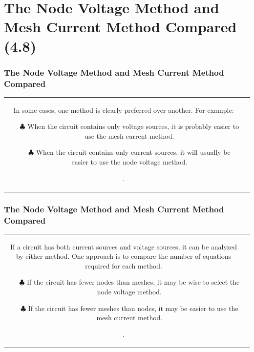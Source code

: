 \documentclass[aspectratio=169]{beamer}
\begin{document}
\section{The Node Voltage Method and Mesh Current Method Compared (4.8)}
\begin{frame}[fragile]
	\frametitle{ The Node Voltage Method and Mesh Current Method Compared}
	\begin{tabular}{cc}
			\begin{columns}
				\begin{column}{1\textwidth}  %
					In some cases, one method is clearly preferred over another. For example:	\newline
		
					\begin{itemize}
						\item[$\clubsuit$] {When the circuit contains
only voltage sources, it is probably easier to use the mesh current method.}
						\item[$\clubsuit$] {When the circuit contains only
current sources, it will usually be easier to use the node voltage method.}						
					\end{itemize}
				.
				\end{column}
			\end{columns}
		
	\end{tabular}
\end{frame}
\begin{frame}[fragile]
	\frametitle{ The Node Voltage Method and Mesh Current Method Compared}
	\begin{tabular}{cc}
			\begin{columns}
				\begin{column}{1\textwidth}  %
					If a circuit has both current sources and voltage sources, it can be analyzed by either method. One
approach is to compare the number of equations required for each method.	\newline
		
					\begin{itemize}
						\item[$\clubsuit$] {If the circuit has fewer nodes
than meshes, it may be wise to select the node voltage method.}
						\item[$\clubsuit$] {If the circuit has fewer meshes than
nodes, it may be easier to use the mesh current method.}						
					\end{itemize}
				.
				\end{column}
			\end{columns}
		
	\end{tabular}
\end{frame}
\end{document}
